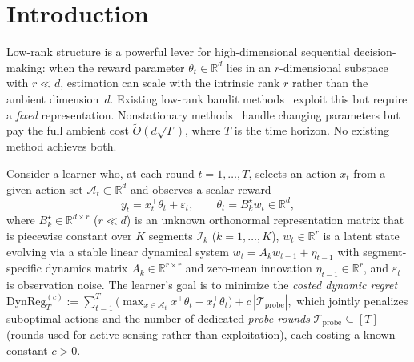 \documentclass{article}
\newcommand{\R}{\mathbb{R}}
\newcommand{\cA}{\mathcal{A}}
\newcommand{\cI}{\mathcal{I}}
\newcommand{\cTprobe}{\mathcal{T}_{\mathrm{probe}}}
\newcommand{\DynReg}{\mathrm{DynReg}}
\begin{document}
\section{Introduction}
\label{sec:intro}
  Low-rank structure is a powerful lever for high-dimensional
  sequential decision-making: when the reward parameter
  $\theta_t \in \R^d$ lies in an $r$-dimensional subspace with
  $r \ll d$, estimation can scale with the intrinsic
  rank $r$ rather than the ambient dimension~$d$. Existing low-rank
  bandit methods~\citep{jun2019bilinear,pmlr-v235-jedra24a,lu2021lowrank}
  exploit this but require a \emph{fixed} representation.
  Nonstationary methods~\citep{russac2019weighted,cheung2019learning}
  handle changing parameters but pay the full ambient cost
  $\widetilde{O}(d\sqrt{T})$, where $T$ is the time horizon.
  No existing method achieves both.

  Consider a learner who, at each round $t = 1, \ldots, T$, selects
  an action $x_t$ from a given action set $\cA_t \subset \R^d$ and
  observes a scalar reward
  \begin{equation}
  y_t = x_t^\top \theta_t + \varepsilon_t, \qquad
  \theta_t = B_k^\star w_t \in \R^d, \label{eq:intro_model}
  \end{equation}
  where $B_k^\star \in \R^{d \times r}$ ($r \ll d$) is an unknown
  orthonormal representation matrix that is piecewise constant over
  $K$ segments $\cI_k$ ($k = 1, \ldots, K$), $w_t \in \R^r$ is
  a latent state evolving via a stable linear dynamical system
  $w_t = A_k w_{t-1} + \eta_{t-1}$ with segment-specific dynamics
  matrix $A_k \in \R^{r \times r}$ and zero-mean innovation
  $\eta_{t-1} \in \R^r$, and $\varepsilon_t$ is observation noise.
  The learner's goal is to minimize the \emph{costed dynamic regret}
  $\DynReg_T^{(c)} := \sum_{t=1}^T \bigl(\max_{x \in \cA_t}
  x^\top\theta_t - x_t^\top\theta_t\bigr) + c\,|\cTprobe|,$
  which jointly penalizes suboptimal actions and the number of
  dedicated \emph{probe rounds} $\cTprobe \subseteq [T]$
  (rounds used for active sensing rather than exploitation), each
  costing a known constant $c > 0$.
\end{document}
